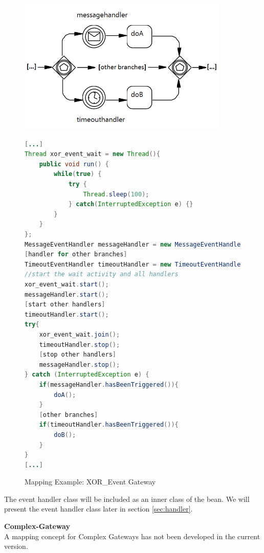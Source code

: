 \begin{figure}[h]
\begin{minipage}[c]{0.5\textwidth}
\includegraphics[width=0.9\textwidth]{images/mapping/xor-event.png}
\end{minipage}
\begin{minipage}[c]{0.5\textwidth}
\begin{lstlisting}[language=Java]
[...]
Thread xor_event_wait = new Thread(){
	public void run() {
		while(true) {
			try {
				Thread.sleep(100);
			} catch(InterruptedException e) {}
		}
	}
};
MessageEventHandler messageHandler = new MessageEventHandler(xor_event_wait);
[handler for other branches]
TimeoutEventHandler timeoutHandler = new TimeoutEventHandler(20000, xor_event_wait);
//start the wait activity and all handlers
xor_event_wait.start();
messageHandler.start();
[start other handlers]
timeoutHandler.start();
try{
	xor_event_wait.join();
	timeoutHandler.stop();
	[stop other handlers]
	messageHandler.stop();
} catch (InterruptedException e) {
	if(messageHandler.hasBeenTriggered()){
		doA();
	}
	[other branches]
	if(timeoutHandler.hasBeenTriggered()){
		doB();
	}
}
[...]
\end{lstlisting}
\end{minipage}
\caption{Mapping Example: XOR\_Event Gateway}%
\label{fig:mapping_xorEvent}%
\end{figure}

The event handler class will be included as an inner class of the bean. We will present the event handler class later in section \ref{sec:handler}.

\textbf{Complex-Gateway}\\
A mapping concept for Complex Gateways has not been developed in the current version. \\

